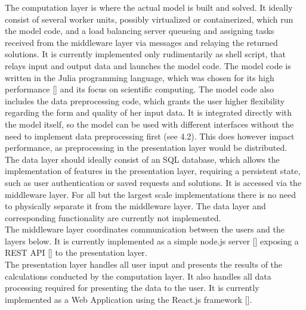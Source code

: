 \documentclass[
	11pt,								%
	DIV10,								%
	a4paper,         					%
	oneside,							%
	headheight=20pt,					%
	footheight=20pt,					%
    parskip=full,						%
    listof=totoc,						%
	bibliography=totoc,					%
	index=totoc,						%
]{scrartcl}
\begin{document}
The computation layer is where the actual model is built and solved. It ideally consist of several worker units, possibly virtualized or containerized, which run the model code, and a load balancing server queueing and assigning tasks received from the middleware layer via messages and relaying the returned solutions. It is currently implemented only rudimentarily as shell script, that relays input and output data and launches the model code. The model code is written in the Julia programming language, which was chosen for its high performance [\cite{JuliaMicroBenchmarks2018}] and its focus on scientific computing. The model code also includes the data preprocessing code, which grants the user higher flexibility regarding the form and quality of her input data. It is integrated directly with the model itself, so the model can be used with different interfaces without the need to implement data preprocessing first (see 4.2). This does however impact performance, as preprocessing in the presentation layer would be distributed. \\
The data layer should ideally consist of an SQL database, which allows the implementation of features in the presentation layer, requiring a persistent state, such as user authentication or saved requests and solutions. It is accessed via the middleware layer. For all but the largest scale implementations there is no need to physically separate it from the middleware layer. The data layer and corresponding functionality are currently not implemented.
\\
The middleware layer coordinates communication between the users and the layers below. It is currently implemented as a simple node.js server [\cite{NodeJs2018}] exposing a REST API [\cite{fieldingArchitecturalStylesDesign2000}] to the presentation layer.
\\
The presentation layer handles all user input and presents the results of the calculations conducted by the computation layer. It also handles all data processing required for presenting the data to the user.  It is currently implemented as a Web Application using the React.js framework [\cite{ReactJavaScriptLibrary2019}]. 
\end{document}
